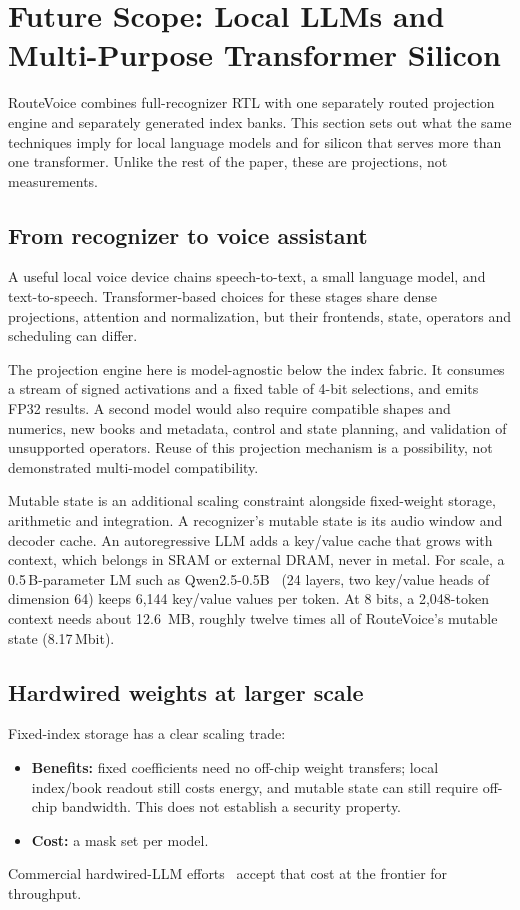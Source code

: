 \section{Future Scope: Local LLMs and Multi-Purpose Transformer Silicon}
\label{sec:future}

RouteVoice combines full-recognizer RTL with one separately routed projection engine and separately generated index banks. This section sets out what the same techniques imply for local language models and for silicon that serves more than one transformer. Unlike the rest of the paper, these are projections, not measurements.

\subsection{From recognizer to voice assistant}
A useful local voice device chains speech-to-text, a small language model, and text-to-speech. Transformer-based choices for these stages share dense projections, attention and normalization, but their frontends, state, operators and scheduling can differ.

The projection engine here is model-agnostic below the index fabric. It consumes a stream of signed activations and a fixed table of 4-bit selections, and emits FP32 results. A second model would also require compatible shapes and numerics, new books and metadata, control and state planning, and validation of unsupported operators. Reuse of this projection mechanism is a possibility, not demonstrated multi-model compatibility.

Mutable state is an additional scaling constraint alongside fixed-weight storage, arithmetic and integration. A recognizer's mutable state is its audio window and decoder cache. An autoregressive LLM adds a key/value cache that grows with context, which belongs in SRAM or external DRAM, never in metal.
For scale, a 0.5\,B-parameter LM such as Qwen2.5-0.5B~\cite{qwen2024qwen25,qwen05config} (24 layers, two key/value heads of dimension 64) keeps 6,144 key/value values per token. At 8 bits, a 2,048-token context needs about \SI{12.6}{MB}, roughly twelve times all of RouteVoice's mutable state (8.17\,Mbit).

\subsection{Hardwired weights at larger scale}
Fixed-index storage has a clear scaling trade:
\begin{itemize}
\item \textbf{Benefits:} fixed coefficients need no off-chip weight transfers; local index/book readout still costs energy, and mutable state can still require off-chip bandwidth. This does not establish a security property.
\item \textbf{Cost:} a mask set per model.
\end{itemize}
Commercial hardwired-LLM efforts~\cite{taalas2026hc1} accept that cost at the frontier for throughput.

